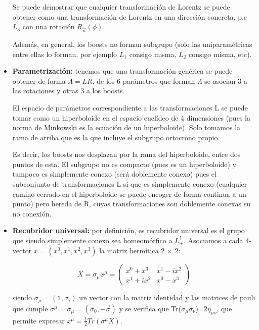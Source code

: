 \documentclass{article}
\begin{document}
\begin{itemize}
            \smallskip
            Se puede demostrar que cualquier transformación de Lorentz se puede obtener como una transformación de Lorentz en una dirección concreta, p.e $L_3$ con una rotación $R_{\Vec{n}}(\phi)$.

            \smallskip
            Además, en general, los boosts no forman subgrupo (solo las uniparamétricas entre ellas lo forman, por ejemplo $L_1$ consigo misma, $L_2$ consigo misma, etc).

            \item \textbf{Parametrización:} tenemos que una transformación genérica se puede obtener de forma $\Lambda =LR$, de los 6 parámetros que forman $\Lambda$ se asocian 3 a las rotaciones y otras 3 a los boosts.

            \smallskip
            El espacio de parámetros correspondiente a las transformaciones L se puede tomar como un hiperboloide en el espacio euclídeo de 4 dimensiones (pues la norma de Minkowski es la ecuación de un hiperboloide). Solo tomamos la rama de arriba que es la que incluye el subgrupo ortocrono propio.

            \smallskip
            Es decir, los boosts nos desplazan por la rama del hiperboloide, entre dos puntos de esta. El subgrupo no es compacto (pues es un hiperboloide) y tampoco es simplemente conexo (será doblemente conexo) pues el subconjunto de transformaciones L si que es simplemente conexo (cualquier camino cerrado en el hiperboloide se puede encoger de forma continua a un punto) pero hereda de R, cuyas transformaciones son doblemente conexas su no conexión.

            \item\textbf{Recubridor universal:} por definición, es recubridor universal es el grupo que siendo simplemente conexo sea homeomórfico a $L_+^\uparrow$. Asociamos a cada 4-vector $x=(x^0,x^1,x^2,x^3)$ la matriz hermítica 2 $\times$ 2:

            $$X=\sigma _\mu x^\mu =\left ( \begin{array}{cc}
                 x^0+x^3 & x^1-ix^2 \\
                 x^1+ix^2 & x^0-x^3
            \end{array}\right)$$

            siendo $\sigma _\mu =(\mathds{1},\sigma _i)$ un vector con la matriz identidad y las matrices de pauli que cumple $\sigma ^\mu =\bar{\sigma}_\mu =(\sigma _0 , -\Vec{\sigma})$ y se verifica que Tr($\bar{\sigma}_\mu \sigma _\nu$)=$2\eta _{\mu \nu}$, que permite expresar $x^\mu =\frac{1}{2}Tr(\sigma ^\mu X)$.


\end{itemize}
\end{document}
